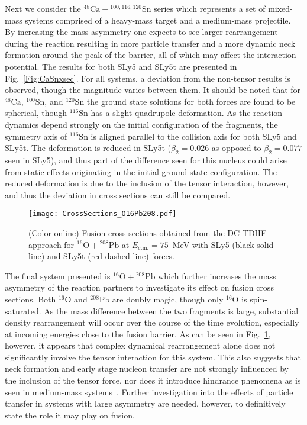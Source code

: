 \documentclass[aps,prc,twocolumn,showpacs,superscriptaddress,longbibliography,floatfix,10pt]{revtex4-1}
\begin{document}
Next we consider the $^{48}\mathrm{Ca}+\mathrm{^{100,116,120}Sn}$ series which represents a set of mixed-mass systems comprised of a heavy-mass target and a medium-mass projectile.
By increasing the mass asymmetry one expects to see larger rearrangement during the reaction resulting in more particle transfer and a more dynamic neck formation around the peak of the barrier, all of which may affect the interaction potential.
The results for both SLy5 and SLy5t are presented in Fig.~\ref{Fig:CaSnxsec}.
For all systems, a deviation from the non-tensor results is observed, though the magnitude varies between them.
It should be noted that for $^{48}\mathrm{Ca}$, $^{100}\mathrm{Sn}$, and $^{120}\mathrm{Sn}$ the ground state solutions for both forces are found to be spherical, though $^{116}\mathrm{Sn}$ has a slight quadrupole deformation.
As the reaction dynamics depend strongly on the initial configuration of the fragments, the symmetry axis of $^{116}\mathrm{Sn}$ is aligned parallel to the collision axis for both SLy5 and SLy5t.
The deformation is reduced in SLy5t ($\beta_2=0.026$ as opposed to $\beta_2=0.077$ seen in SLy5), and thus part of the difference seen for this nucleus could arise from static effects originating in the initial ground state configuration.
The reduced deformation is due to the inclusion of the tensor interaction, however, and thus the deviation in cross sections can still be compared.


\begin{figure}
	\texttt{[image: CrossSections\_O16Pb208.pdf]}
	\caption{(Color online) Fusion cross sections obtained from the DC-TDHF approach for $^{16}\mathrm{O}+\mathrm{^{208}Pb}$ at $E_{\mathrm{c.m.}}=75$~MeV with SLy5 (black solid line) and SLy5t (red dashed line) forces.
	\label{Fig:OPbxsec}}
\end{figure}

The final system presented is $^{16}\mathrm{O}+\mathrm{^{208}Pb}$ which further increases the mass asymmetry of the reaction partners to investigate its effect on fusion cross sections.
Both $^{16}\mathrm{O}$ and $\mathrm{^{208}Pb}$ are doubly magic, though only $^{16}\mathrm{O}$ is spin-saturated.
As the mass difference between the two fragments is large, substantial density rearrangement will occur over the course of the time evolution, especially at incoming energies close to the fusion barrier.
As can be seen in Fig.~\ref{Fig:OPbxsec}, however, it appears that complex dynamical rearrangement alone does not significantly involve the tensor interaction for this system.
This also suggests that neck formation and early stage nucleon transfer are not strongly influenced by the inclusion of the tensor force, nor does it introduce hindrance phenomena as is seen in medium-mass systems~\cite{guo2018}.
Further investigation into the effects of particle transfer in systems with large asymmetry are needed, however, to definitively state the role it may play on fusion.
\end{document}
